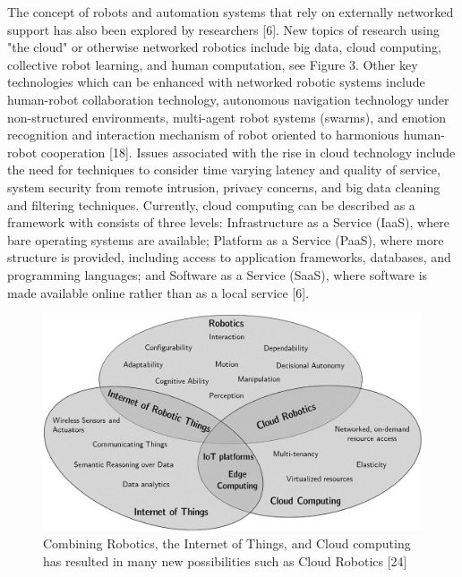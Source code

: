 The concept of robots and automation systems that rely on externally networked support has also been explored by researchers [6]. New topics of research using "the cloud" or otherwise networked robotics include big data, cloud computing, collective robot learning, and human computation, see Figure 3. Other key technologies which can be enhanced with networked robotic systems include human-robot collaboration technology, autonomous navigation technology under non-structured environments, multi-agent robot systems (swarms), and emotion recognition and interaction mechanism of robot oriented to harmonious human-robot cooperation [18]. Issues associated with the rise in cloud technology include the need for techniques to consider time varying latency and quality of service, system security from remote intrusion, privacy concerns, and big data cleaning and filtering techniques. Currently, cloud computing can be described as a framework with consists of three levels: Infrastructure as a Service (IaaS), where bare operating systems are available; Platform as a Service (PaaS), where more structure is provided, including access to application frameworks, databases, and programming languages; and Software as a Service (SaaS), where software is made available online rather than as a local service [6].

\begin{figure}[b!]
    \begin{center}
        \includegraphics[width=0.8\linewidth]{figures/TradeStudy/figure3.jpg}
        \caption{Combining Robotics, the Internet of Things, and Cloud computing has resulted in many new possibilities such as Cloud Robotics [24]}
    \end{center}
\end{figure}

